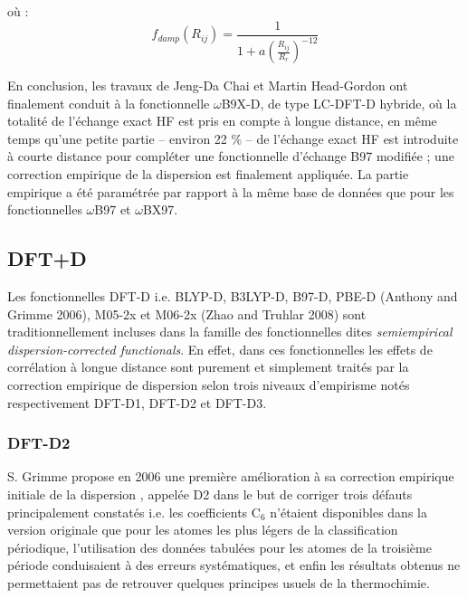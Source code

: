 	\noindent où :
	\begin{equation}
	f_{damp} (R_{ij})=\frac{1}{1+a(\frac{R_{ij}}{R_{r}})^{-12}}
	\end{equation}
	
	En conclusion, les travaux de Jeng-Da Chai et Martin Head-Gordon ont finalement conduit à la fonctionnelle $\omega$B9X-D, de type LC-DFT-D hybride, où la totalité de l'échange exact HF est pris en compte à longue distance, en même temps qu'une petite partie -- environ 22 \% -- de l'échange exact HF est introduite à courte distance pour compléter une fonctionnelle d'échange B97 modifiée ; une correction empirique de la dispersion est finalement appliquée. La partie empirique a été paramétrée par rapport à la même base de données que pour les fonctionnelles $\omega$B97 et $\omega$BX97.
	
	\subsection{DFT+D}
	
	Les fonctionnelles DFT-D i.e. BLYP-D, B3LYP-D, B97-D, PBE-D (Anthony and Grimme 2006), M05-2x et M06-2x (Zhao and Truhlar 2008) sont traditionnellement incluses dans la famille des fonctionnelles dites \textit{semiempirical dispersion-corrected functionals}. En effet, dans ces fonctionnelles les effets de corrélation à longue distance sont purement et simplement traités par la correction empirique de dispersion selon trois niveaux d’empirisme notés respectivement DFT-D1, DFT-D2 et DFT-D3. 
	
	\subsubsection{DFT-D2}
	
	S. Grimme \cite{grimme2006semiempirical} propose en 2006 une première amélioration à sa correction empirique initiale de la dispersion \cite{grimme2004accurate}, appelée D2 dans le but de corriger trois défauts principalement constatés i.e. les coefficients C$_{6}$ n’étaient disponibles dans la version originale que pour les atomes les plus légers de la classification périodique, l’utilisation des données tabulées pour les atomes de la troisième période conduisaient à des erreurs systématiques, et enfin les résultats obtenus ne permettaient pas de retrouver quelques principes usuels de la thermochimie.  
	
